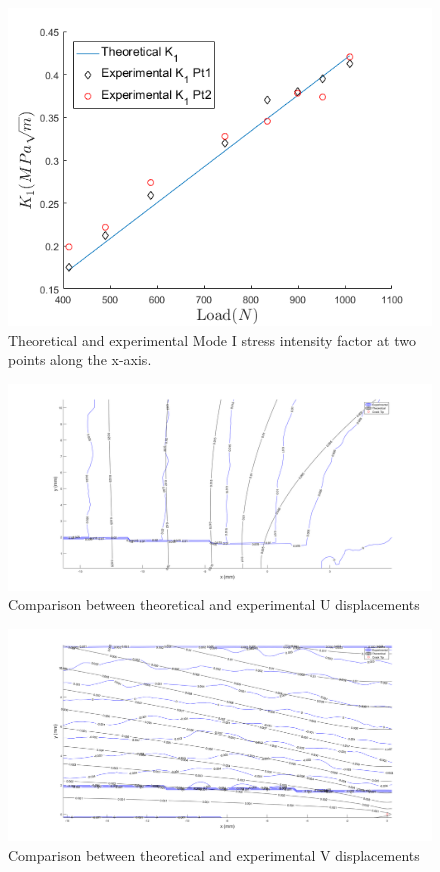 \documentclass[12pt]{article}
\begin{document}
\begin{figure}[H]
	\begin{center}
		
		\includegraphics[width=1\textwidth]{K_1_Comparisons.png}
		\caption{Theoretical and experimental Mode I stress intensity factor at two points along the x-axis.}
		\label{fig:K1}
	\end{center}
\end{figure}

\begin{figure}[H]
	\centering
	\includegraphics[width=1\textwidth]{cc_x.png}
	\caption{Comparison between theoretical and experimental U displacements}
	\label{fig:cc1}
\end{figure}

\begin{figure}[H]
	\centering
	\includegraphics[width=1\textwidth]{cc_y.png}
	\caption{Comparison between theoretical and experimental V displacements}
	\label{fig:cc2}
\end{figure}
\end{document}
